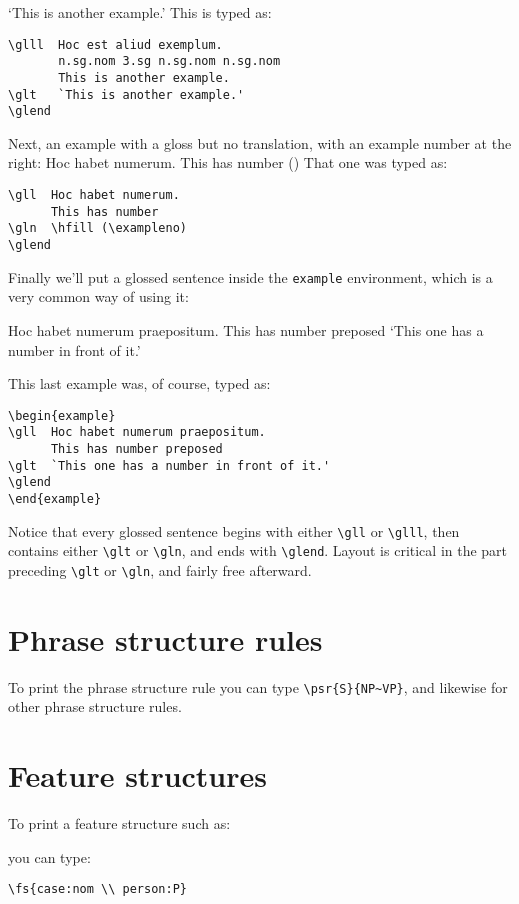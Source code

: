 \documentclass{article}
\begin{document}
\glt   `This is another example.'
\glend
This is typed as:
\begin{verbatim}
\glll  Hoc est aliud exemplum.
       n.sg.nom 3.sg n.sg.nom n.sg.nom
       This is another example.
\glt   `This is another example.'
\glend
\end{verbatim}
Next, an example with a gloss but no translation, with an example number 
at the right:
\gll  Hoc habet numerum.
      This has number
\gln  \hfill (\exampleno)
\glend
That one was typed as:
\begin{verbatim}
\gll  Hoc habet numerum.
      This has number
\gln  \hfill (\exampleno)
\glend
\end{verbatim}
Finally we'll put a glossed sentence inside the \texttt{example} 
environment, which is a very common way of using it:
\begin{example}
\gll  Hoc habet numerum praepositum.
      This has number preposed
\glt  `This one has a number in front of it.'
\glend
\end{example}
This last example was, of course, typed as:
\begin{verbatim}
\begin{example}
\gll  Hoc habet numerum praepositum.
      This has number preposed
\glt  `This one has a number in front of it.'
\glend
\end{example}
\end{verbatim}
Notice that every glossed sentence begins with either \verb"\gll" or 
\verb"\glll", then contains either \verb"\glt" or \verb"\gln", and ends 
with \verb"\glend".  Layout is critical in the part preceding 
\verb"\glt" or \verb"\gln", and fairly free afterward.

\section{Phrase structure rules}

To print the phrase structure rule  you can type
\verb"\psr{S}{NP~VP}", and likewise for other phrase structure rules.

\section{Feature structures}

To print a feature structure such as:
\begin{flushleft}
\end{flushleft}
you can type:
\begin{verbatim}
\fs{case:nom \\ person:P}
\end{verbatim}
\end{document}
